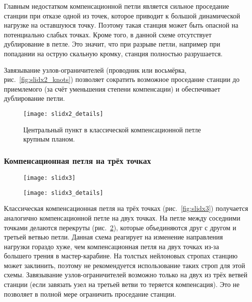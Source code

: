 \documentclass[fleqn, 12pt]{extarticle}
\begin{document}
	Главным недостатком компенсационной петли является сильное проседание станции при отказе одной из точек, которое приводит к большой динамической нагрузке на оставшуюся точку.
    Поэтому такая станция может быть опасной на потенциально слабых точках. Кроме того, в данной схеме отсутствует дублирование в петле. Это значит, что при разрыве петли, например
    при попадании на острую скальную кромку, станция полностью разрушается.
    
    Завязывание узлов-ограничителей (проводник или восьмёрка, рис.~\ref{fig:slidx2_knots}) позволяет сократить возможное проседание станции до приемлемого (за счёт уменьшения степени компенсации)
    и обеспечивает дублирование петли.
    
    \begin{figure}
        \centering
        \texttt{[image: slidx2\_details]}
        \caption{Центральный пункт в классической компенсационной петле крупным планом.}\label{fig:slidx2_details}
    \end{figure}
    
    \subsubsection{Компенсационная петля на трёх точках}
    \begin{figure}[h]
        \centering
        \begin{minipage}[t]{0.45\textwidth}
            \texttt{[image: slidx3]}
            \label{fig:slidx3}
        \end{minipage}\hspace{0.05\textwidth}
        \begin{minipage}[t]{0.45\textwidth}
            \texttt{[image: slidx3\_details]}
            \label{fig:slidx3_details}
        \end{minipage} 
    \end{figure}
    Классическая компенсационная петля на трёх точках (рис.~\ref{fig:slidx3}) получается аналогично компенсационной петле на двух точках.
    На петле между соседними точками делаются перекруты (рис.~\ref{fig:slidx3_details}),
    которые объединяются друг с другом и третьей ветвью петли. Данная схема реагирует на изменение направления нагрузки гораздо хуже, чем компенсационная петля на двух точках
    из-за большего трения в мастер-карабине. На толстых нейлоновых стропах станцию может заклинить, поэтому не рекомендуется использование таких строп для этой схемы.
    Завязывание узлов-ограничителей возможно только на двух из трёх ветвей станции (если завязать узел на третьей ветви то теряется компенсация). Это не позволяет в полной мере
    ограничить проседание станции.
    
\end{document}
